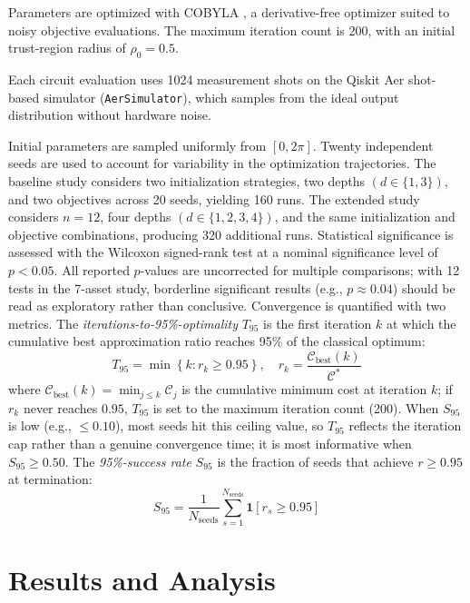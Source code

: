 \documentclass[runningheads]{llncs}
\begin{document}
Parameters are optimized with COBYLA \cite{powell1994}, a derivative-free optimizer suited to noisy objective evaluations. The maximum iteration count is 200, with an initial trust-region radius of \(\rho_0=0.5\).

Each circuit evaluation uses 1024 measurement shots on the Qiskit Aer shot-based simulator (\texttt{AerSimulator}), which samples from the ideal output distribution without hardware noise.

Initial parameters are sampled uniformly from $[0,2\pi]$. Twenty independent seeds are used to account for variability in the optimization trajectories.
The baseline study considers two initialization strategies, two depths $(d\in\{1,3\})$, and two objectives across 20 seeds, yielding 160 runs. The extended study considers $n=12$, four depths $(d\in\{1,2,3,4\})$, and the same initialization and objective combinations, producing 320 additional runs.
Statistical significance is assessed with the Wilcoxon signed-rank test at a nominal significance level of $p<0.05$. All reported $p$-values are uncorrected for multiple comparisons; with 12 tests in the 7-asset study, borderline significant results (e.g., $p \approx 0.04$) should be read as exploratory rather than conclusive.
Convergence is quantified with two metrics. The \textit{iterations-to-95\%-optimality} $T_{95}$ is the first iteration $k$ at which the cumulative best approximation ratio reaches 95\% of the classical optimum:
\begin{equation}
    T_{95} = \min \left\{ k : r_k \geq 0.95 \right\}, \quad
    r_k = \frac{\mathcal{C}_{\text{best}}(k)}{\mathcal{C}^*}
\end{equation}
where $\mathcal{C}_{\text{best}}(k) = \min_{j \leq k} \mathcal{C}_j$ is the cumulative minimum cost at iteration $k$; if $r_k$ never reaches $0.95$, $T_{95}$ is set to the maximum iteration count (200). When $S_{95}$ is low (e.g., $\leq 0.10$), most seeds hit this ceiling value, so $T_{95}$ reflects the iteration cap rather than a genuine convergence time; it is most informative when $S_{95} \geq 0.50$. The \textit{95\%-success rate} $S_{95}$ is the fraction of seeds that achieve $r \geq 0.95$ at termination:
\begin{equation}
    S_{95} = \frac{1}{N_{\text{seeds}}} \sum_{s=1}^{N_{\text{seeds}}} \mathbf{1}[r_s \geq 0.95]
\end{equation}
\section{Results and Analysis}
\end{document}
